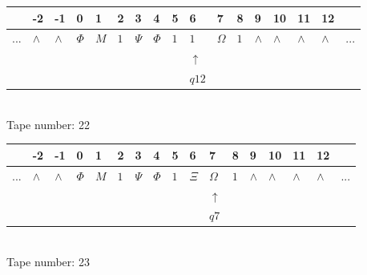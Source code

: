 \documentclass[11pt]{article}
\begin{document}
\begin{table}[H]
\centering
\begin{tabular}{lllllllllllllllll}
 & -2 & -1 & 0 & 1 & 2 & 3 & 4 & 5 & 6 & 7 & 8 & 9 & 10 & 11 & 12 & \\
\hline
$...$ & \multicolumn{1}{|l|}{$\wedge$} & \multicolumn{1}{|l|}{$\wedge$} & \multicolumn{1}{|l|}{$\Phi$} & \multicolumn{1}{|l|}{$M$} & \multicolumn{1}{|l|}{$1$} & \multicolumn{1}{|l|}{$\Psi$} & \multicolumn{1}{|l|}{$\Phi$} & \multicolumn{1}{|l|}{$1$} & \multicolumn{1}{|l|}{$1$} & \multicolumn{1}{|l|}{$\Omega$} & \multicolumn{1}{|l|}{$1$} & \multicolumn{1}{|l|}{$\wedge$} & \multicolumn{1}{|l|}{$\wedge$} & \multicolumn{1}{|l|}{$\wedge$} & \multicolumn{1}{|l|}{$\wedge$} & $...$\\
\hline
&  &  &  &  &  &  &  &  & $\uparrow$ &  &  &  &  &  &  &  \\
&  &  &  &  &  &  &  &  & $ q12 $ &  &  &  &  &  &  &  \\
\end{tabular}
\\
Tape number: 22
\noindent\makebox[\linewidth]{\hdashrule{\textwidth}{1pt}{1pt}}\end{table}

\begin{table}[H]
\centering
\begin{tabular}{lllllllllllllllll}
 & -2 & -1 & 0 & 1 & 2 & 3 & 4 & 5 & 6 & 7 & 8 & 9 & 10 & 11 & 12 & \\
\hline
$...$ & \multicolumn{1}{|l|}{$\wedge$} & \multicolumn{1}{|l|}{$\wedge$} & \multicolumn{1}{|l|}{$\Phi$} & \multicolumn{1}{|l|}{$M$} & \multicolumn{1}{|l|}{$1$} & \multicolumn{1}{|l|}{$\Psi$} & \multicolumn{1}{|l|}{$\Phi$} & \multicolumn{1}{|l|}{$1$} & \multicolumn{1}{|l|}{$\Xi$} & \multicolumn{1}{|l|}{$\Omega$} & \multicolumn{1}{|l|}{$1$} & \multicolumn{1}{|l|}{$\wedge$} & \multicolumn{1}{|l|}{$\wedge$} & \multicolumn{1}{|l|}{$\wedge$} & \multicolumn{1}{|l|}{$\wedge$} & $...$\\
\hline
&  &  &  &  &  &  &  &  &  & $\uparrow$ &  &  &  &  &  &  \\
&  &  &  &  &  &  &  &  &  & $ q7 $ &  &  &  &  &  &  \\
\end{tabular}
\\
Tape number: 23
\noindent\makebox[\linewidth]{\hdashrule{\textwidth}{1pt}{1pt}}\end{table}
\clearpage
\end{document}
